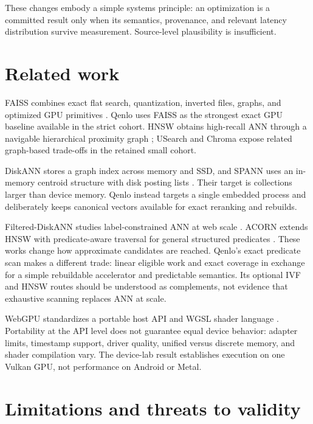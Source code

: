 \documentclass{article}
\begin{document}
These changes embody a simple systems principle: an optimization is a committed result only when
its semantics, provenance, and relevant latency distribution survive measurement. Source-level
plausibility is insufficient.

\section{Related work}

FAISS combines exact flat search, quantization, inverted files, graphs, and optimized GPU
primitives \citep{johnson2019billion,douze2024faiss}. Qenlo uses FAISS as the strongest exact GPU
baseline available in the strict cohort. HNSW obtains high-recall ANN through a navigable
hierarchical proximity graph \citep{malkov2020hnsw}; USearch and Chroma expose related graph-based
trade-offs in the retained small cohort.

DiskANN stores a graph index across memory and SSD, and SPANN uses an in-memory centroid structure
with disk posting lists \citep{subramanya2019diskann,chen2021spann}. Their target is collections
larger than device memory. Qenlo instead targets a single embedded process and deliberately keeps
canonical vectors available for exact reranking and rebuilds.

Filtered-DiskANN studies label-constrained ANN at web scale \citep{gollapudi2023filtered}. ACORN
extends HNSW with predicate-aware traversal for general structured predicates
\citep{patel2024acorn}. These works change how approximate candidates are reached. Qenlo's exact
predicate scan makes a different trade: linear eligible work and exact coverage in exchange for a
simple rebuildable accelerator and predictable semantics. Its optional IVF and HNSW routes should
be understood as complements, not evidence that exhaustive scanning replaces ANN at scale.

WebGPU standardizes a portable host API and WGSL shader language \citep{webgpu,wgsl}. Portability
at the API level does not guarantee equal device behavior: adapter limits, timestamp support,
driver quality, unified versus discrete memory, and shader compilation vary. The device-lab result
establishes execution on one Vulkan GPU, not performance on Android or Metal.

\section{Limitations and threats to validity}
\end{document}
